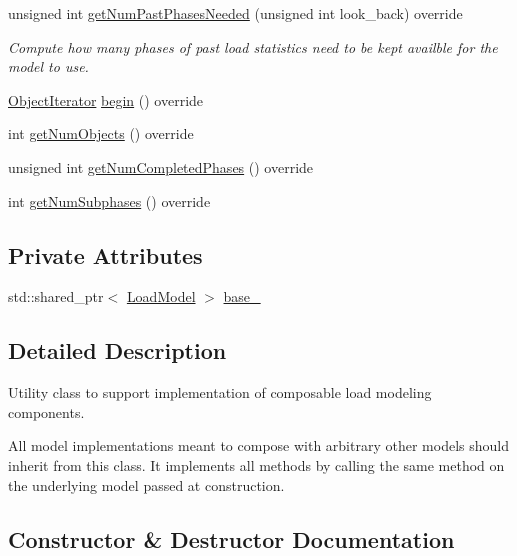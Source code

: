\begin{DoxyCompactItemize}
unsigned int \hyperlink{classvt_1_1vrt_1_1collection_1_1balance_1_1_composed_model_abf2a02ff624e66c7076bfe3dce961981}{get\+Num\+Past\+Phases\+Needed} (unsigned int look\+\_\+back) override
\begin{DoxyCompactList}\small\item\em Compute how many phases of past load statistics need to be kept availble for the model to use. \end{DoxyCompactList}\item 
\hyperlink{structvt_1_1vrt_1_1collection_1_1balance_1_1_object_iterator}{Object\+Iterator} \hyperlink{classvt_1_1vrt_1_1collection_1_1balance_1_1_composed_model_a8f34205887c08a22a1e5bef6ee358f2b}{begin} () override
\item 
int \hyperlink{classvt_1_1vrt_1_1collection_1_1balance_1_1_composed_model_a7b383954706cb8069e841a87c3ff3f8f}{get\+Num\+Objects} () override
\item 
unsigned int \hyperlink{classvt_1_1vrt_1_1collection_1_1balance_1_1_composed_model_a2797ee7c1b39b815fe63279a7d67ed90}{get\+Num\+Completed\+Phases} () override
\item 
int \hyperlink{classvt_1_1vrt_1_1collection_1_1balance_1_1_composed_model_af3ea09828c281d9c278198a19fe4e533}{get\+Num\+Subphases} () override
\end{DoxyCompactItemize}
\subsection*{Private Attributes}
\begin{DoxyCompactItemize}
\item 
std\+::shared\+\_\+ptr$<$ \hyperlink{structvt_1_1vrt_1_1collection_1_1balance_1_1_load_model}{Load\+Model} $>$ \hyperlink{classvt_1_1vrt_1_1collection_1_1balance_1_1_composed_model_a8a2a6b2d5e79a7c02002132913c9ae55}{base\+\_\+}
\end{DoxyCompactItemize}


\subsection{Detailed Description}
Utility class to support implementation of composable load modeling components. 

All model implementations meant to compose with arbitrary other models should inherit from this class. It implements all methods by calling the same method on the underlying model passed at construction. 

\subsection{Constructor \& Destructor Documentation}
\mbox{\label{classvt_1_1vrt_1_1collection_1_1balance_1_1_composed_model_a84b77c1fceb9e07a0706b896a4d9e9c9}} 
